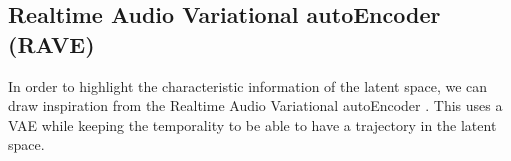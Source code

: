 \documentclass{article}
\begin{document}

\subsection{Realtime Audio Variational autoEncoder (RAVE)}



In order to highlight the characteristic information of the latent space, we can draw inspiration from the Realtime Audio Variational autoEncoder \cite{caillonRAVEVariationalAutoencoder2021}. This uses a VAE while keeping the temporality to be able to have a trajectory in the latent space.
\end{document}
